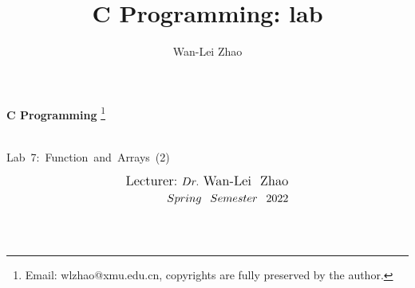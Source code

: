 \documentclass[t]{beamer}
\title{C Programming: lab}
\author{Wan-Lei Zhao}
\newcommand\blfootnote[1]{
  \begingroup
  \renewcommand\thefootnote{}\footnote{#1}
  \addtocounter{footnote}{-1}
  \endgroup
}
\begin{document}
\begin{frame}
   \begin{center}
    \vspace{24pt}
    \Huge\textbf{C Programming}\blfootnote{Email: wlzhao@xmu.edu.cn, copyrights are fully preserved by the author.}\\
     \Huge{\mbox{Lab 7: Function and Arrays (2)}}
    \vspace{36pt}
  \end{center}
  \begin{align*}
   \vspace{18pt}
      \large{\mbox{Lecturer:}~Dr.~\mbox{Wan-Lei~~Zhao}} \\
      \large{Spring~~Semester~~2022} \\
   \vspace{30pt}
  \end{align*}
\end{frame}



\section{}
\end{document}
